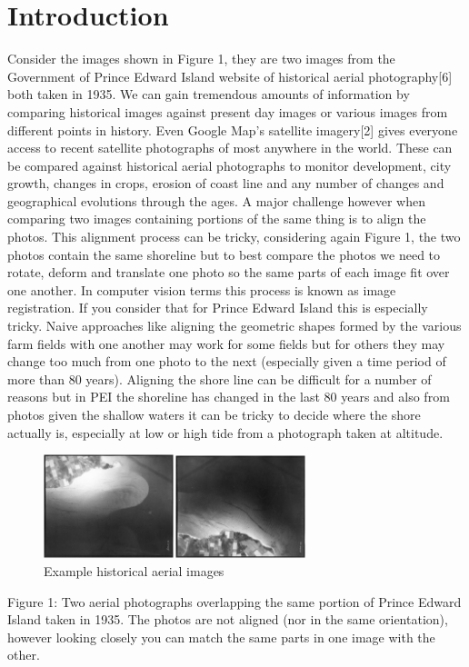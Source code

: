 
\chapter{Introduction}
Consider the images shown in Figure 1, they are two images from the Government of Prince Edward Island website of historical aerial photography[6] both taken in 1935. We can gain tremendous amounts of information by comparing historical images against present day images or various images from different points in history. Even Google Map’s satellite imagery[2] gives everyone access to recent satellite photographs of most anywhere in the world. These can be compared against historical aerial photographs to monitor development, city growth, changes in crops, erosion of coast line and any number of changes and geographical evolutions through the ages. 
A major challenge however when comparing two images containing portions of the same thing is to align the photos. This alignment process can be tricky, considering again Figure 1, the two photos contain the same shoreline but to best compare the photos we need to rotate, deform and translate one photo so the same parts of each image fit over one another. In computer vision terms this process is known as image registration. 
If you consider that for Prince Edward Island this is especially tricky. Naive approaches like aligning the geometric shapes formed by the various farm fields with one another may work for some fields but for others they may change too much from one photo to the next (especially given a time period of more than 80 years). Aligning the shore line can be difficult for a number of reasons but in PEI the shoreline has changed in the last 80 years and also from photos given the shallow waters it can be tricky to decide where the shore actually is, especially at low or high tide from a photograph taken at altitude.
\begin{figure}
    \centering
    \includegraphics[width=3.0in]{figs/test}
    \caption{Example historical aerial images}
 
\end{figure}

Figure 1: Two aerial photographs overlapping the same portion of Prince Edward Island taken in 1935. The photos are not aligned (nor in the same orientation), however looking closely you can match the same parts in one image with the other. 
 
